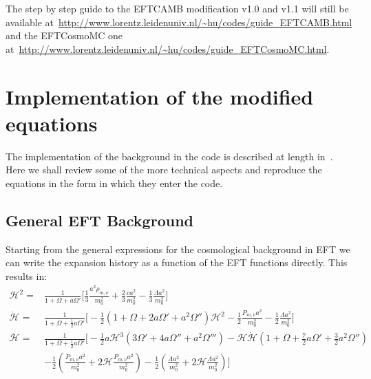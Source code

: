 \documentclass[prd,nofootinbib,showpacs]{revtex4}
\def\hub{{\mathcal H}}
\begin{document}
{The step by step guide to the EFTCAMB modification v1.0 and v1.1 will still be available at~\url{http://www.lorentz.leidenuniv.nl/~hu/codes/guide_EFTCAMB.html} and the  EFTCosmoMC one at~\url{http://www.lorentz.leidenuniv.nl/~hu/codes/guide_EFTCosmoMC.html}.

\section{Implementation of the modified equations}\label{Sec:ModEquations}
The implementation of the background in the code is described at length in~\cite{Hu:2013twa}. Here we shall review some of the more technical aspects and reproduce the equations in the form in which they enter the code. 

\subsection{General EFT Background} \label{SubSec:FullEFTBackground}
%
Starting from the general expressions for the cosmological background in EFT we can write the expansion history as a function of the EFT functions directly.
This results in:
%
\begin{align}
\hub^2 =& \frac{1}{1+\Omega +a\Omega'} \bigg[ \frac{1}{3} \frac{a^2\rho_{m,\nu}}{m_0^2} +\frac{2}{3}\frac{ca^2}{m_0^2}  -\frac{1}{3} \frac{\Lambda a^2}{m_0^2}\bigg] \nonumber \\
\dot{\hub} =& \frac{1}{1+\Omega+\frac{1}{2}a\Omega'} \bigg[ -\frac{1}{2}\left( 1+\Omega+2a\Omega' +a^2\Omega'' \right)\hub^2 -\frac{1}{2}\frac{P_{m,\nu}a^2}{m_0^2} -\frac{1}{2}\frac{\Lambda a^2}{m_0^2} \bigg] \nonumber \\
\ddot{\hub} =& \frac{1}{1+\Omega +\frac{1}{2}a\Omega' } \bigg[ -\frac{1}{2}a\hub^3\left( 3\Omega' +4a\Omega'' +a^2\Omega'''\right) -\hub\dot{\hub}\left( 1+\Omega +\frac{7}{2}a\Omega' +\frac{3}{2}a^2\Omega'' \right) \nonumber \\
&-\frac{1}{2}\left( \frac{\dot{P}_{m,\nu}a^2}{m_0^2} +2\hub \frac{P_{m,\nu}a^2}{m_0^2}\right) -\frac{1}{2}\left( \frac{\dot{\Lambda}a^2}{m_0^2} +2\hub \frac{\Lambda a^2}{m_0^2}\right) \bigg]
\end{align}
%

}
\end{document}
